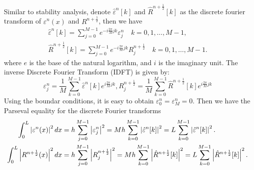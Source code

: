 \documentclass[10pt, reqno]{amsart}
\theoremstyle{remark}
\theoremstyle{definition}
\numberwithin{table}{section}
\begin{document}
Similar to stability analysis, denote $\hat{\varepsilon}^n[k]$ and $\hat{R}^{n+\frac{1}{2}}[k]$ as the discrete fourier transform of $\varepsilon^n(x)$ and $R^{n+\frac{1}{2}}$, then we have
\begin{equation}
\begin{aligned}\label{suppose}
\hat{\varepsilon}^n[k]=\sum_{j=0}^{M-1} e^{-i \frac{2 \pi}{M} j k} \varepsilon^n_j \quad k=0, 1,  \ldots,  M-1 , \\
\hat{R}^{n+\frac{1}{2}}[k]=\sum_{j=0}^{M-1} e^{-i \frac{2 \pi}{M} j k} R^{n+\frac{1}{2}}_j \quad k=0, 1,  \ldots,  M-1 . 
\end{aligned}
\end{equation}
where \( e \) is the base of the natural logarithm,  and \( i \) is the imaginary unit.  The inverse Discrete Fourier Transform (IDFT) is given by:
\[
\varepsilon^n_j = \frac{1}{M} \sum_{k=0}^{M-1} \hat{\varepsilon}^n[k] e^{i \frac{2\pi}{M} jk}, R^{n+\frac{1}{2}}_j = \frac{1}{M} \sum_{k=0}^{M-1} \hat{R}^{n+\frac{1}{2}}[k] e^{i \frac{2\pi}{M} jk}
\]
Using the boundar conditions, it is easy to obtain $\varepsilon^n_0=\varepsilon^n_M=0$. Then we have the Parseval equality for the discrete Fourier transforms
\begin{align}
    \int_0^L\left|\varepsilon^n(x)\right|^2 d x&=h\sum_{j=0}^{M-1}\left|\varepsilon^n_j\right|^2=Mh\sum_{k=0}^{M-1}\left|\hat{\varepsilon}^n[k]\right|^2 =L\sum_{k=0}^{M-1}\left|\hat{\varepsilon}^n[k]\right|^2. \notag\\
    \int_0^L\left|R^{n+\frac{1}{2}}(x)\right|^2 d x&=h\sum_{j=0}^{M-1}\left|R^{n+\frac{1}{2}}_j\right|^2=Mh\sum_{k=0}^{M-1}\left|\hat{R}^{n+\frac{1}{2}}[k]\right|^2 =L\sum_{k=0}^{M-1}\left|\hat{R}^{n+\frac{1}{2}}[k]\right|^2. \notag
\end{align}
\end{document}

